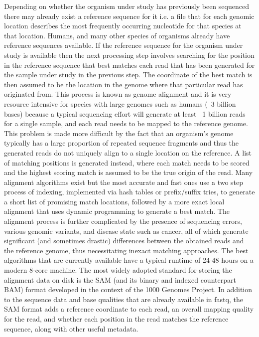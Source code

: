 Depending on whether the organism under study has previously been sequenced there may already exist a reference sequence for it i.e. a file that for each genomic location describes the most frequently occurring nucleotide for that species at that location. Humans, and many other species of organisms already have reference sequences available. If the reference sequence for the organism under study is available then the next processing step involves searching for the position in the reference sequence that best matches each read that has been generated for the sample under study in the previous step. The coordinate of the best match is then assumed to be the location in the genome where that particular read has originated from. This process is known as genome alignment and it is very resource intensive for species with large genomes such as humans (~3 billion bases) because a typical sequencing effort will generate at least ~1 billion reads for a single sample, and each read needs to be mapped to the reference genome. This problem is made more difficult by the fact that an organism's genome typically has a large proportion of repeated sequence fragments and thus the generated reads do not uniquely align to a single location on the reference. A list of matching positions is generated instead, where each match needs to be scored and the highest scoring match is assumed to be the true origin of the read. Many alignment algorithms exist but the most accurate and fast ones use a two step process of indexing, implemented via hash tables or prefix/suffix tries, to generate a short list of promising match locations, followed by a more exact local alignment that uses dynamic programming to generate a best match. The alignment process is further complicated by the presence of sequencing errors, various genomic variants, and disease state such as cancer, all of which generate significant (and sometimes drastic) differences between the obtained reads and the reference genome, thus necessitating inexact matching approaches. The best algorithms that are currently available have a typical runtime of 24-48 hours on a modern 8-core machine. The most widely adopted standard for storing the alignment data on disk is the SAM\autocite{li2009sequence} (and its binary and indexed counterpart BAM) format developed in the context of the 1000 Genomes Project. In addition to the sequence data and base qualities that are already available in fastq, the SAM format adds a reference coordinate to each read, an overall mapping quality for the read, and whether each position in the read matches the reference sequence, along with other useful metadata. 

